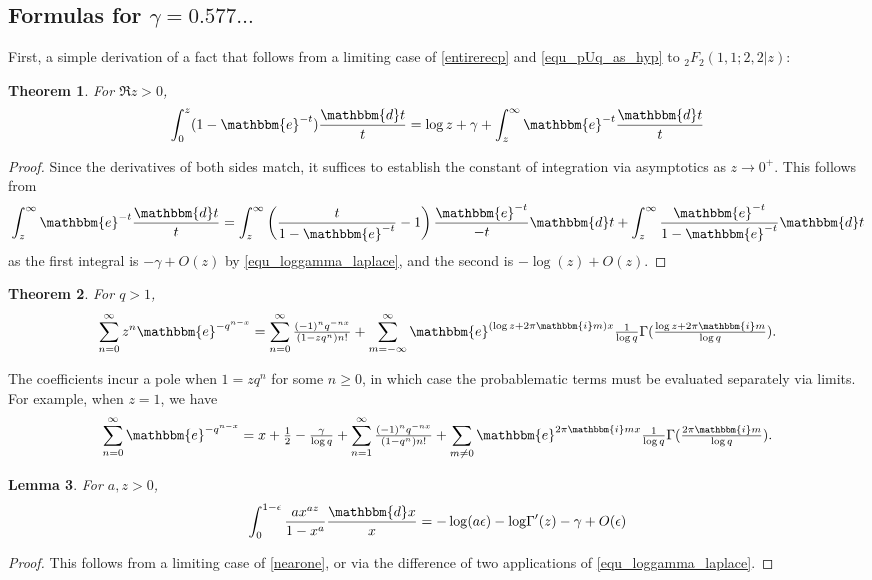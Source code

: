 \documentclass[12pt]{article}
\newcommand{\ee}[0] {\mathbbm{e}}
\newcommand{\ii}[0] {\mathbbm{i}}
\newcommand{\dd}[0] {\mathbbm{d}}
\newcommand{\logG} {\operatorname {log \Gamma}}
\numberwithin{equation}{section}
\newtheorem{theorem}{Theorem}[section]
\newtheorem{lemma}[theorem]{Lemma}
\newcommand{\FFf}[5] {{}_{#1}{#2}_{#3} \left(#4 | {#5} \right)}
\begin{document}
\subsection{Formulas for $\gamma = 0.577 \dots$}
First, a simple derivation of a fact that follows from a limiting case of \eqref{entirerecp}
 and \eqref{equ_pUq_as_hyp} to $\FFf{2}{F}{2}{1,1;2,2}{z}$:
\begin{theorem}
For $\Re z > 0$,
\begin{equation*}
\int_{0}^{z} (1-\ee^{-t}) \frac{\dd t}{t}
 = \log z + \gamma + \int_{z}^{\infty} \ee^{-t} \frac{\dd t}{t}
\end{equation*}
\end{theorem}
\begin{proof}
Since the derivatives of both sides match, it suffices to establish the constant of integration via asymptotics as $z\to0^{+}$. This follows from
\begin{equation*}
\int_{z}^{\infty} \ee^{-t} \frac{\dd t}{t} = \int_{z}^{\infty} \left(\frac{t}{1-\ee^{-t}}-1 \right) \frac{\ee^{-t}}{-t} \dd t + \int_{z}^{\infty} \frac{\ee^{-t}}{1-\ee^{-t}} \dd t
\end{equation*}
as the first integral is $-\gamma + O(z)$ by \eqref{equ_loggamma_laplace}, and the second is $-\log(z) + O(z)$.
\end{proof}

\begin{theorem}
For $q > 1$,
\begin{equation*}
\sum_{n=0}^{\infty}z^{n} \ee^{-q^{n-x}} = \sum_{n=0}^{\infty} \tfrac{(-1)^n q^{-n x}}{(1-z q^n)n!} + \sum_{m=-\infty}^{\infty} \ee^{(\log z + 2\pi \ii m) x} \tfrac{1}{\log q}\Gamma(\tfrac{\log z + 2 \pi \ii m}{\log q})\text{.}
\end{equation*}
\end{theorem}
The coefficients incur a pole when $1=z q^n$ for some $n \ge 0$, in which case the probablematic terms must be evaluated separately via limits. For example, when $z=1$, we have
\begin{equation*}
\sum_{n=0}^{\infty} \ee^{-q^{n-x}} = x + \tfrac{1}{2} - \tfrac{\gamma}{\log q} + \sum_{n=1}^{\infty} \tfrac{(-1)^n q^{-n x}}{(1-q^n)n!} + \sum_{m \ne 0} \ee^{2\pi \ii m x}
\tfrac{1}{\log q}\Gamma(\tfrac{2 \pi \ii m}{\log q})\text{.}
\end{equation*}


\begin{lemma}
For $a,z>0$,
\begin{equation*}
\int_{0}^{1-\epsilon} \frac{a x^{a z}}{1-x^a} \frac{\dd x}{x} = - \log(a \epsilon) -\logG'(z)-\gamma + O(\epsilon)
\end{equation*}
\end{lemma}
\begin{proof}
This follows from a limiting case of \eqref{nearone}, or via the difference of two applications of \eqref{equ_loggamma_laplace}.
\end{proof}
\end{document}
